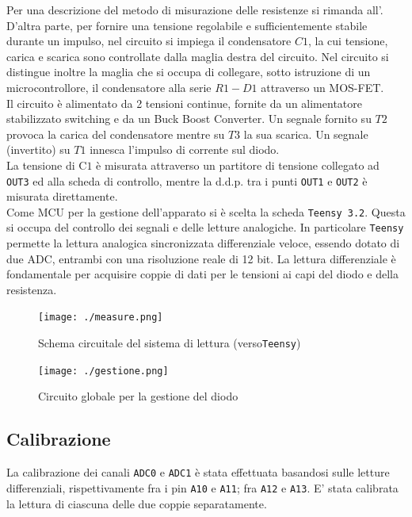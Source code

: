 \documentclass{article}[a4paper, oneside, 11pt]
\begin{document}
Per una descrizione del metodo di misurazione delle resistenze si rimanda 
all'.
D'altra parte, per fornire una tensione regolabile e sufficientemente stabile
durante un impulso, nel circuito si impiega il condensatore $C1$, la cui
tensione, carica e scarica sono controllate dalla maglia destra del circuito.
Nel circuito si distingue inoltre la maglia che si occupa di collegare, sotto
istruzione di un microcontrollore, il condensatore alla serie $R1-D1$
attraverso un MOS-FET.\\
Il circuito \`e alimentato da 2 tensioni continue, fornite da un alimentatore
stabilizzato switching e da un Buck Boost Converter.
Un segnale fornito su $T2$ provoca la carica del condensatore mentre su $T3$
la sua scarica. Un segnale (invertito) su $T1$ innesca l'impulso di corrente
sul diodo.\\
La tensione di C$1$ \`e misurata attraverso un partitore di tensione collegato 
ad \verb+OUT3+ ed alla scheda di controllo, mentre la d.d.p. tra i punti
\verb+OUT1+ e \verb+OUT2+ \`e misurata direttamente.\\
Come MCU per la gestione dell'apparato si \`e scelta la scheda 
\verb+Teensy 3.2+\cite{teensy}. Questa si occupa del controllo dei segnali e 
delle letture analogiche. In particolare \verb+Teensy+ permette la lettura
analogica sincronizzata differenziale veloce, essendo dotato di due ADC,
entrambi con una risoluzione reale di 12 bit. La lettura differenziale \`e
fondamentale per acquisire coppie di dati per le tensioni ai capi del diodo
e della resistenza.

\begin{figure}[!htb]
\centering 
	\texttt{[image: ./measure.png]}
\caption{Schema circuitale del sistema di lettura (verso\texttt{Teensy})
\label{sch:rdng}}
\end{figure}

\begin{figure}[h!t]
\centering 
	\texttt{[image: ./gestione.png]}
\caption{Circuito globale per la gestione del diodo \label{sch:gest}}
\end{figure}

\subsection{Calibrazione}\label{sec: cal}

La calibrazione dei canali \verb+ADC0+ e \verb+ADC1+ \`e stata effettuata
basandosi sulle letture differenziali, rispettivamente fra i pin \verb+A10+
e \verb+A11+; fra \verb+A12+ e \verb+A13+. E’ stata calibrata la lettura
di ciascuna delle due coppie separatamente.
\end{document}

